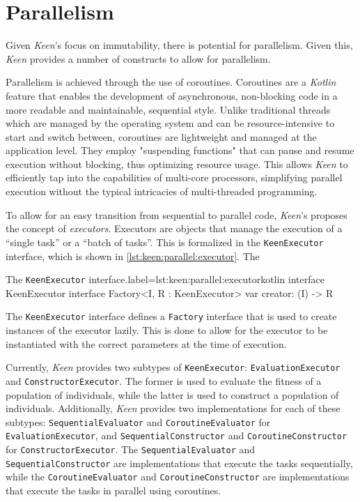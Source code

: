 \section{Parallelism}
\label{sec:keen:parallel}
  Given \textit{Keen}'s focus on immutability, there is potential for
  parallelism. Given this, \textit{Keen} provides a number of constructs
  to allow for parallelism. 

  Parallelism is achieved through the use of coroutines. Coroutines are a 
  \textit{Kotlin} feature that enables the development of asynchronous, 
  non-blocking code in a more readable and maintainable, sequential style. 
  Unlike traditional threads which are managed by the operating system and can 
  be resource-intensive to start and switch between, coroutines are lightweight 
  and managed at the application level. They employ "suspending functions" that 
  can pause and resume execution without blocking, thus optimizing resource 
  usage. This allows \textit{Keen} to efficiently tap into the capabilities of 
  multi-core processors, simplifying parallel execution without the typical 
  intricacies of multi-threaded programming.
  
  To allow for an easy transition from sequential to parallel code, 
  \textit{Keen}'s proposes the concept of \textit{executors}. Executors are
  objects that manage the execution of a \enquote{single task} or a
  \enquote{batch of tasks}. This is formalized in the \texttt{KeenExecutor}
  interface, which is shown in \autoref{lst:keen:parallel:executor}. The
  
  \begin{code}{The \texttt{KeenExecutor} interface.}{label={lst:keen:parallel:executor}}{kotlin}
    interface KeenExecutor {
        interface Factory<I, R : KeenExecutor> {
            var creator: (I) -> R
        }
    }
  \end{code}

  The \texttt{KeenExecutor} interface defines a \texttt{Factory} interface
  that is used to create instances of the executor lazily. This is done to
  allow for the executor to be instantiated with the correct parameters at
  the time of execution.

  Currently, \textit{Keen} provides two subtypes of \texttt{KeenExecutor}:
  \texttt{EvaluationExecutor} and \texttt{ConstructorExecutor}. The former is
  used to evaluate the fitness of a population of individuals, while the latter
  is used to construct a population of individuals.
  Additionally, \textit{Keen} provides two implementations for each of these
  subtypes: \texttt{SequentialEvaluator} and \texttt{CoroutineEvaluator} for
  \texttt{EvaluationExecutor}, and \texttt{SequentialConstructor} and
  \texttt{CoroutineConstructor} for \texttt{ConstructorExecutor}. The
  \texttt{SequentialEvaluator} and \texttt{SequentialConstructor} are
  implementations that execute the tasks sequentially, while the
  \texttt{CoroutineEvaluator} and \texttt{CoroutineConstructor} are
  implementations that execute the tasks in parallel using coroutines.

